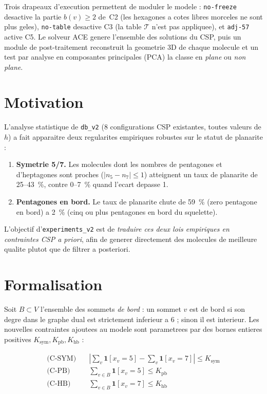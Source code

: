 \documentclass[11pt,a4paper]{article}
\begin{document}
Trois drapeaux d'execution permettent de moduler le modele :
\texttt{no-freeze} desactive la partie $b(v) \ge 2$ de~C2 (les
hexagones a cotes libres morceles ne sont plus geles),
\texttt{no-table} desactive C3 (la table $\mathcal{T}$ n'est pas
appliquee), et \texttt{adj-57} active C5. Le solveur ACE genere
l'ensemble des solutions du CSP, puis un module de post-traitement
reconstruit la geometrie 3D de chaque molecule et un test par analyse
en composantes principales (PCA) la classe en \emph{plane} ou
\emph{non plane}.

\section{Motivation}

L'analyse statistique de \texttt{db\_v2} (8 configurations CSP
existantes, toutes valeurs de $h$) a fait apparaitre deux regularites
empiriques robustes sur le statut de planarite :
\begin{enumerate}[leftmargin=*,itemsep=2pt]
  \item \textbf{Symetrie 5/7.} Les molecules dont les nombres de
        pentagones et d'heptagones sont proches ($|n_5 - n_7| \le 1$)
        atteignent un taux de planarite de 25--43~\%, contre 0--7~\%
        quand l'ecart depasse 1.
  \item \textbf{Pentagones en bord.} Le taux de planarite chute de
        59~\% (zero pentagone en bord) a 2~\% (cinq ou plus pentagones
        en bord du squelette).
\end{enumerate}

L'objectif d'\texttt{experiments\_v2} est de \emph{traduire ces deux
lois empiriques en contraintes CSP a priori}, afin de generer
directement des molecules de meilleure qualite plutot que de filtrer a
posteriori.

\section{Formalisation}

Soit $B \subset V$ l'ensemble des sommets \emph{de bord} : un sommet
$v$ est de bord si son degre dans le graphe dual est strictement
inferieur a 6 ; sinon il est interieur. Les nouvelles contraintes
ajoutees au modele sont parametrees par des bornes entieres positives
$K_{\text{sym}}, K_{\text{pb}}, K_{\text{hb}}$ :

\begin{align*}
  \text{(C-SYM)} \quad & \left| \textstyle\sum_v \mathbf{1}[x_v=5] - \sum_v \mathbf{1}[x_v=7] \right| \le K_{\text{sym}} \\
  \text{(C-PB)}  \quad & \sum_{v \in B} \mathbf{1}[x_v=5] \le K_{\text{pb}} \\
  \text{(C-HB)}  \quad & \sum_{v \in B} \mathbf{1}[x_v=7] \le K_{\text{hb}}
\end{align*}
\end{document}
